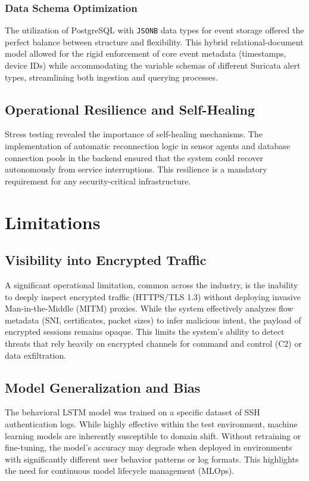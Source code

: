 \documentclass[12pt,a4paper]{report} %
\begin{document}
\subsubsection{Data Schema Optimization}
The utilization of PostgreSQL with \texttt{JSONB} data types for event storage offered the perfect balance between structure and flexibility. This hybrid relational-document model allowed for the rigid enforcement of core event metadata (timestamps, device IDs) while accommodating the variable schemas of different Suricata alert types, streamlining both ingestion and querying processes.

\subsection{Operational Resilience and Self-Healing}
Stress testing revealed the importance of self-healing mechanisms. The implementation of automatic reconnection logic in sensor agents and database connection pools in the backend ensured that the system could recover autonomously from service interruptions. This resilience is a mandatory requirement for any security-critical infrastructure.

\section{Limitations}

\subsection{Visibility into Encrypted Traffic}
A significant operational limitation, common across the industry, is the inability to deeply inspect encrypted traffic (HTTPS/TLS 1.3) without deploying invasive Man-in-the-Middle (MITM) proxies. While the system effectively analyzes flow metadata (SNI, certificates, packet sizes) to infer malicious intent, the payload of encrypted sessions remains opaque. This limits the system's ability to detect threats that rely heavily on encrypted channels for command and control (C2) or data exfiltration.

\subsection{Model Generalization and Bias}
The behavioral LSTM model was trained on a specific dataset of SSH authentication logs. While highly effective within the test environment, machine learning models are inherently susceptible to domain shift. Without retraining or fine-tuning, the model's accuracy may degrade when deployed in environments with significantly different user behavior patterns or log formats. This highlights the need for continuous model lifecycle management (MLOps).
\end{document}
